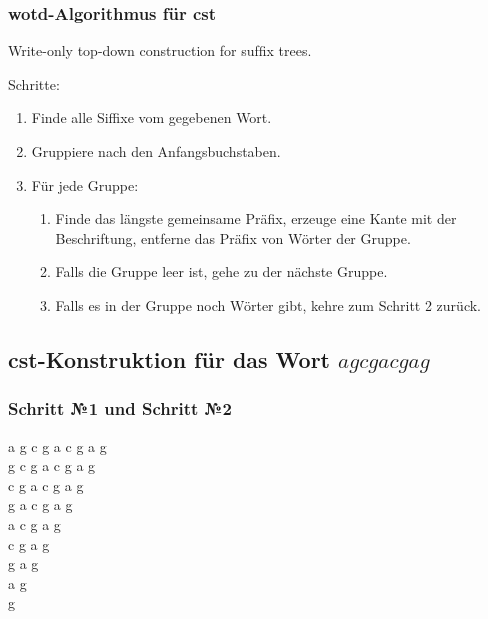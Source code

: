 \documentclass{beamer}
\begin{document}
\begin{frame}[t]
\frametitle{wotd-Algorithmus für cst}

Write-only top-down construction for sufﬁx trees.\\

\bigskip

Schritte:
\begin{enumerate}
\item Finde alle Siffixe vom gegebenen Wort.
\item Gruppiere nach den Anfangsbuchstaben.
\item Für jede Gruppe:
\begin{enumerate}
\item Finde das längste gemeinsame Präfix, erzeuge eine Kante mit der Beschriftung, entferne das Präfix von Wörter der Gruppe.
\item Falls die Gruppe leer ist, gehe zu der nächste Gruppe.
\item Falls es in der Gruppe noch Wörter gibt, kehre zum Schritt 2 zurück.
\end{enumerate} 
\end{enumerate}

\end{frame}


\subsection{cst-Konstruktion für das Wort $agcgacgag$}

\begin{frame}[t]
\frametitle{Schritt №1 und Schritt №2}

a g c g a c g a g \\
g c g a c g a g \\
c g a c g a g \\
g a c g a g \\
a c g a g \\
c g a g \\
g a g \\
a g \\
g \\
\end{frame}
\end{document}
